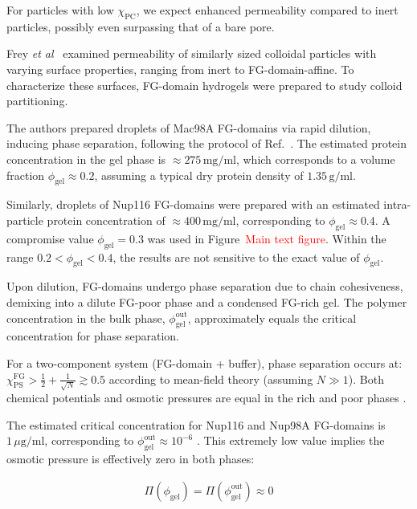 \documentclass[10pt, a4paper]{article}
\newcommand\todo[1]{\textcolor{red}{#1}}
\begin{document}
\begin{multicols}{2}
For particles with low $\chi_{\text{PC}}$, we expect enhanced permeability compared to inert particles, possibly even surpassing that of a bare pore.

Frey \textit{et al}~\cite{Frey2018} examined permeability of similarly sized colloidal particles with varying surface properties, ranging from inert to FG-domain-affine.
To characterize these surfaces, FG-domain hydrogels were prepared to study colloid partitioning.

The authors prepared droplets of Mac98A FG-domains via rapid dilution, inducing phase separation, following the protocol of Ref.~\cite{Schmidt2015}.
The estimated protein concentration in the gel phase is $\approx 275 \, \text{mg}/\text{ml}$, which corresponds to a volume fraction $\phi_{\text{gel}} \approx 0.2$, assuming a typical dry protein density of $1.35 \, \text{g}/\text{ml}$.

Similarly, droplets of Nup116 FG-domains were prepared with an estimated intra-particle protein concentration of $\approx 400 \, \text{mg}/\text{ml}$, corresponding to $\phi_{\text{gel}} \approx 0.4$. A compromise value $\phi_{\text{gel}} = 0.3$ was used in Figure~\todo{Main text figure}.
Within the range $0.2 < \phi_{\text{gel}} < 0.4$, the results are not sensitive to the exact value of $\phi_{\text{gel}}$.

Upon dilution, FG-domains undergo phase separation due to chain cohesiveness, demixing into a dilute FG-poor phase and a condensed FG-rich gel.
The polymer concentration in the bulk phase, $\phi_{\text{gel}}^{\text{out}}$, approximately equals the critical concentration for phase separation.

For a two-component system (FG-domain + buffer), phase separation occurs at:
$
\chi_{\text{PS}}^{\text{FG}} > \frac{1}{2} + \frac{1}{\sqrt{N}} \gtrsim 0.5
$
according to mean-field theory (assuming $N \gg 1$). 
Both chemical potentials and osmotic pressures are equal in the rich and poor phases \cite{Vovk2016, Zilman2018}.

The estimated critical concentration for Nup116 and Nup98A FG-domains is $1 \, \mu\text{g}/\text{ml}$, corresponding to $\phi_{\text{gel}}^{\text{out}} \approx 10^{-6}$ \cite{Schmidt2015}.
This extremely low value implies the osmotic pressure is effectively zero in both phases:

\begin{eqnarray}
    \Pi(\phi_{\text{gel}}) = \Pi(\phi_{\text{gel}}^{\text{out}}) \approx 0
\end{eqnarray}


\end{multicols}
\end{document}
